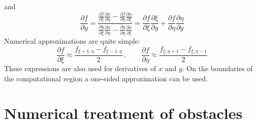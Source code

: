\documentclass[12pt]{book}
\begin{document}
and
\begin{equation}
  \frac{\partial f}{\partial y} = \frac{\frac{\partial f}{\partial\xi}\frac{\partial x}{\partial\eta}-\frac{\partial f}{\partial\eta}\frac{\partial x}{\partial\xi}}
                                       {\frac{\partial y}{\partial\xi}\frac{\partial x}{\partial\eta}-\frac{\partial y}{\partial\eta}\frac{\partial x}{\partial\xi}} =
  \frac{\partial f}{\partial \xi}\frac{\partial \xi}{\partial y} + \frac{\partial f}{\partial \eta}\frac{\partial \eta}{\partial y}
\end{equation}
Numerical approximations are quite simple:
\begin{equation}
  \frac{\partial f}{\partial \xi} \approx \frac{f_{\xi+1,\eta} - f_{\xi-1,\eta}}{2}\, , \qquad
  \frac{\partial f}{\partial \eta} \approx \frac{f_{\xi,\eta+1} - f_{\xi,\eta-1}}{2}
\end{equation}
These expressions are also used for derivatives of $x$ and $y$. On the boundaries of the computational region a one-sided approximation can be used.

\section{Numerical treatment of obstacles}
\label{sec:numobst}
\end{document}
